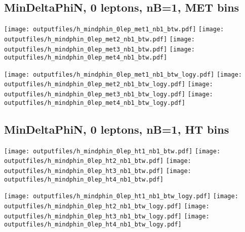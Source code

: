 \documentclass[11pt]{article}
\begin{document}
    \clearpage


    \subsection{ MinDeltaPhiN, 0 leptons, nB=1, MET bins }

    \noindent
     \texttt{[image: outputfiles/h\_mindphin\_0lep\_met1\_nb1\_btw.pdf]}
     \texttt{[image: outputfiles/h\_mindphin\_0lep\_met2\_nb1\_btw.pdf]}
     \texttt{[image: outputfiles/h\_mindphin\_0lep\_met3\_nb1\_btw.pdf]}
     \texttt{[image: outputfiles/h\_mindphin\_0lep\_met4\_nb1\_btw.pdf]}

    \noindent
     \texttt{[image: outputfiles/h\_mindphin\_0lep\_met1\_nb1\_btw\_logy.pdf]}
     \texttt{[image: outputfiles/h\_mindphin\_0lep\_met2\_nb1\_btw\_logy.pdf]}
     \texttt{[image: outputfiles/h\_mindphin\_0lep\_met3\_nb1\_btw\_logy.pdf]}
     \texttt{[image: outputfiles/h\_mindphin\_0lep\_met4\_nb1\_btw\_logy.pdf]}

    \clearpage



    \subsection{ MinDeltaPhiN, 0 leptons, nB=1, HT bins }

    \noindent
     \texttt{[image: outputfiles/h\_mindphin\_0lep\_ht1\_nb1\_btw.pdf]}
     \texttt{[image: outputfiles/h\_mindphin\_0lep\_ht2\_nb1\_btw.pdf]}
     \texttt{[image: outputfiles/h\_mindphin\_0lep\_ht3\_nb1\_btw.pdf]}
     \texttt{[image: outputfiles/h\_mindphin\_0lep\_ht4\_nb1\_btw.pdf]}

    \noindent
     \texttt{[image: outputfiles/h\_mindphin\_0lep\_ht1\_nb1\_btw\_logy.pdf]}
     \texttt{[image: outputfiles/h\_mindphin\_0lep\_ht2\_nb1\_btw\_logy.pdf]}
     \texttt{[image: outputfiles/h\_mindphin\_0lep\_ht3\_nb1\_btw\_logy.pdf]}
     \texttt{[image: outputfiles/h\_mindphin\_0lep\_ht4\_nb1\_btw\_logy.pdf]}

    \clearpage



\end{document}
